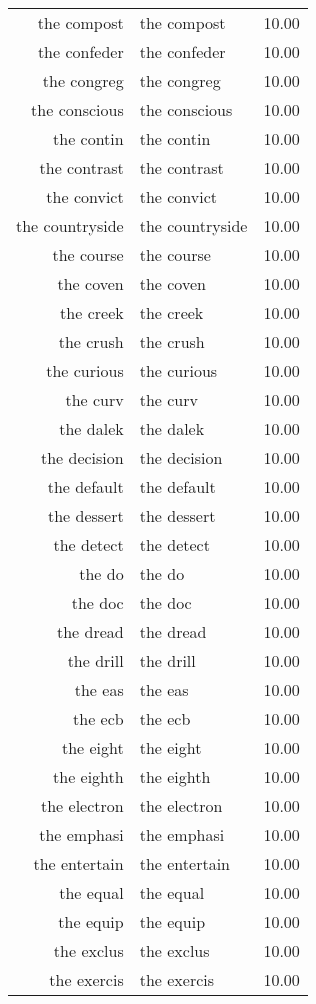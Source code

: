 \begin{table}[ht]
\begin{tabular}{rlr}
  the compost & the compost & 10.00 \\ 
  the confeder & the confeder & 10.00 \\ 
  the congreg & the congreg & 10.00 \\ 
  the conscious & the conscious & 10.00 \\ 
  the contin & the contin & 10.00 \\ 
  the contrast & the contrast & 10.00 \\ 
  the convict & the convict & 10.00 \\ 
  the countryside & the countryside & 10.00 \\ 
  the course & the course & 10.00 \\ 
  the coven & the coven & 10.00 \\ 
  the creek & the creek & 10.00 \\ 
  the crush & the crush & 10.00 \\ 
  the curious & the curious & 10.00 \\ 
  the curv & the curv & 10.00 \\ 
  the dalek & the dalek & 10.00 \\ 
  the decision & the decision & 10.00 \\ 
  the default & the default & 10.00 \\ 
  the dessert & the dessert & 10.00 \\ 
  the detect & the detect & 10.00 \\ 
  the do & the do & 10.00 \\ 
  the doc & the doc & 10.00 \\ 
  the dread & the dread & 10.00 \\ 
  the drill & the drill & 10.00 \\ 
  the eas & the eas & 10.00 \\ 
  the ecb & the ecb & 10.00 \\ 
  the eight & the eight & 10.00 \\ 
  the eighth & the eighth & 10.00 \\ 
  the electron & the electron & 10.00 \\ 
  the emphasi & the emphasi & 10.00 \\ 
  the entertain & the entertain & 10.00 \\ 
  the equal & the equal & 10.00 \\ 
  the equip & the equip & 10.00 \\ 
  the exclus & the exclus & 10.00 \\ 
  the exercis & the exercis & 10.00 \\ 

\end{tabular}
\end{table}
